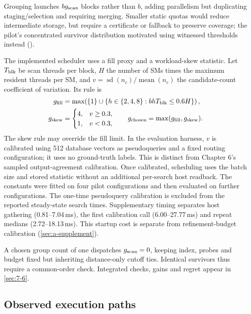 Grouping launches $bg_{\mathrm{scan}}$ blocks rather than $b$, adding parallelism but duplicating staging/selection and requiring merging. Smaller static quotas
would reduce intermediate storage, but require a certificate or fallback
to preserve coverage; the pilot's concentrated survivor distribution
motivated using witnessed thresholds instead ().

The implemented scheduler uses a fill proxy and a workload-skew
statistic. Let $T_{\rm blk}$ be scan threads per block, $H$ the number of SMs times
the maximum resident threads per SM, and
$v=\operatorname{sd}(n_c)/\operatorname{mean}(n_c)$ the candidate-count
coefficient of variation. Its rule is
\begin{align}
 g_{\rm fill}
 &=\max\!\left(\{1\}\cup
       \{h\in\{2,4,8\}:bhT_{\rm blk}\leq0.6H\}\right),
       \label{eq:5-fill-rule}\\
 g_{\rm skew}&=
   \begin{cases}4,&v\geq0.3,\\1,&v<0.3,\end{cases}
 \qquad
 g_{\rm chosen}=\max(g_{\rm fill},g_{\rm skew}).
 \label{eq:5-skew-rule}
\end{align}
The skew rule may override the fill limit. In the evaluation harness,
$v$ is calibrated using 512 database vectors as pseudoqueries and a
fixed routing configuration; it uses no ground-truth labels. This is
distinct from Chapter 6's sampled output-agreement calibration. Once
calibrated, scheduling uses the batch size and stored statistic without
an additional per-search host readback. The constants were fitted on
four pilot configurations and then evaluated on further configurations.
The one-time pseudoquery calibration is excluded from
the reported steady-state search times. Supplementary timing separates
host gathering (0.81--7.04\,ms), the first calibration call
(6.00--27.77\,ms) and repeat medians (2.72--18.13\,ms). This startup
cost is separate from refinement-budget calibration (\cref{sec:a-supplement}).

A chosen group count of one dispatches $g_{\mathrm{scan}}=0$, keeping index, probes and budget fixed but inheriting distance-only cutoff ties. Identical survivors thus require a common-order check. Integrated checks, gains and regret appear in \cref{sec:7-6}.

\subsection{Observed execution paths}

